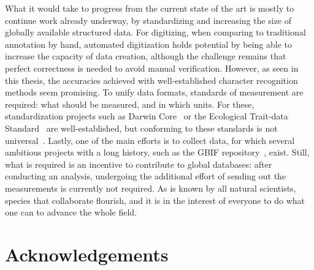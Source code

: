 \documentclass[english,twoside,openright]{UH_DS_MSc}
\begin{document}
What it would take to progress from the current state of the art is mostly to continue work already underway, by standardizing and increasing the size of globally available structured data.
For digitizing, when comparing to traditional annotation by hand, automated digitization holds potential by being able to increase the capacity of data creation, although the challenge remains that perfect correctness is needed to avoid manual verification. However, as seen in this thesis, the accuracies achieved with well-established character recognition methods seem promising.
To unify data formats, standards of measurement are required: what should be measured, and in which units. For these, standardization projects such as Darwin Core~\cite{darwincore} or the Ecological Trait-data Standard~\cite{ets-trait-data-standard} are well-established, but conforming to these standards is not universal~\cite{groomImprovedStandardizationTranscribed2019}.
Lastly, one of the main efforts is to collect data, for which several ambitious projects with a long history, such as the GBIF repository~\cite{gbif}, exist.
 Still, what is required is an incentive to contribute to global databases: after 
conducting an analysis, undergoing the additional effort of sending out the measurements is currently not required. As is known by all natural scientists, species that collaborate flourish, and it is in the interest of everyone to do what one can to advance the whole field.

\chapter{Acknowledgements}
\end{document}
